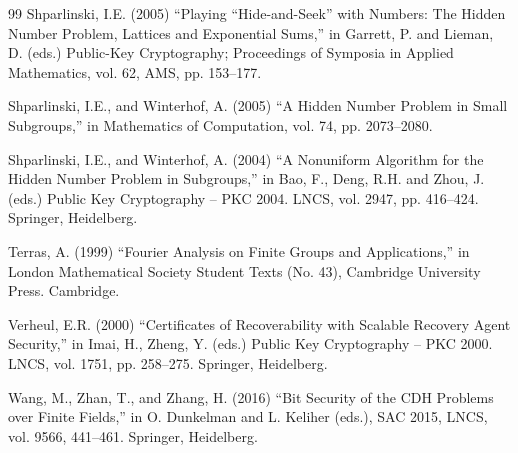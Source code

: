 \documentclass[11pt]{article}
\theoremstyle{definition}
\begin{document}
\begin{thebibliography}{99}
    {Shparlinski, I.E. (2005)
        ``Playing ``Hide-and-Seek'' with Numbers: The Hidden Number Problem, Lattices and Exponential Sums,'' in Garrett, P. and Lieman, D. (eds.) Public-Key Cryptography; Proceedings of Symposia in Applied Mathematics, vol. 62, AMS, pp. 153--177.}

    {Shparlinski, I.E., and Winterhof, A. (2005)
        ``A Hidden Number Problem in Small Subgroups,'' in Mathematics of Computation, vol. 74, pp. 2073--2080.}

    {Shparlinski, I.E., and Winterhof, A. (2004)
        ``A Nonuniform Algorithm for the Hidden Number Problem in Subgroups,'' in Bao, F., Deng, R.H. and Zhou, J. (eds.) Public Key Cryptography -- PKC 2004. LNCS, vol. 2947, pp. 416--424. Springer, Heidelberg.}

    {Terras, A. (1999)
        ``Fourier Analysis on Finite Groups and Applications,'' in London Mathematical Society Student Texts (No. 43), Cambridge University Press. Cambridge.}

    {Verheul, E.R. (2000)
        ``Certificates of Recoverability with Scalable Recovery Agent Security,'' in Imai, H., Zheng, Y. (eds.) Public Key Cryptography -- PKC 2000. LNCS, vol. 1751, pp. 258--275. Springer, Heidelberg.}

    {Wang, M., Zhan, T., and Zhang, H. (2016)
        ``Bit Security of the CDH Problems over Finite Fields,'' in O. Dunkelman and L. Keliher (eds.), SAC 2015, LNCS, vol. 9566, 441--461. Springer, Heidelberg.}


\end{thebibliography}
\end{document}
